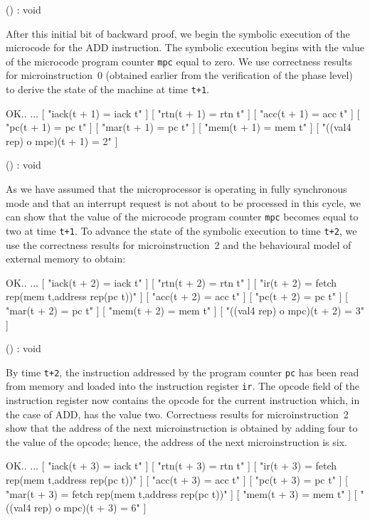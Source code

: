 () : void
\endtt

After this initial bit of backward proof,
we begin the symbolic execution of the microcode for
the ADD instruction.
The symbolic execution begins with the value of the microcode program
counter \verb"mpc" equal to zero.
We use correctness results for microinstruction~0
(obtained earlier from the verification of the phase level)
to derive the state of the machine
at time \verb"t+1".

\begintt
OK..
    \(\ldots\)
    [ "iack(t + 1) = iack t" ]
    [ "rtn(t + 1) = rtn t" ]
    [ "acc(t + 1) = acc t" ]
    [ "pc(t + 1) = pc t" ]
    [ "mar(t + 1) = pc t" ]
    [ "mem(t + 1) = mem t" ]
    [ "((val4 rep) o mpc)(t + 1) = 2" ]

() : void
\endtt

As we have assumed that the microprocessor is operating in fully
synchronous mode and that an interrupt request is not
about to be processed in this cycle,
we can show that the value of the
microcode program counter \verb"mpc" becomes equal to two
at time \verb"t+1".
To advance the state of the symbolic execution to time \verb"t+2",
we use the correctness results for microinstruction~2
and the behavioural model of external memory to obtain:

\begintt
OK..
    \(\ldots\)
    [ "iack(t + 2) = iack t" ]
    [ "rtn(t + 2) = rtn t" ]
    [ "ir(t + 2) = fetch rep(mem t,address rep(pc t))" ]
    [ "acc(t + 2) = acc t" ]
    [ "pc(t + 2) = pc t" ]
    [ "mar(t + 2) = pc t" ]
    [ "mem(t + 2) = mem t" ]
    [ "((val4 rep) o mpc)(t + 2) = 3" ]

() : void
\endtt

By time \verb"t+2",
the instruction addressed by the program counter \verb"pc" has been
read from memory and loaded into the instruction register \verb"ir".
The opcode field of the instruction register now contains the
opcode for the current instruction which, in the case of ADD,
has the value two.
Correctness results for microinstruction~2 show that
the address of the next microinstruction is obtained
by adding four to the value of the opcode;
hence, the address of the next microinstruction is six.

\begintt
OK..
    \(\ldots\)
    [ "iack(t + 3) = iack t" ]
    [ "rtn(t + 3) = rtn t" ]
    [ "ir(t + 3) = fetch rep(mem t,address rep(pc t))" ]
    [ "acc(t + 3) = acc t" ]
    [ "pc(t + 3) = pc t" ]
    [ "mar(t + 3) = fetch rep(mem t,address rep(pc t))" ]
    [ "mem(t + 3) = mem t" ]
    [ "((val4 rep) o mpc)(t + 3) = 6" ]

